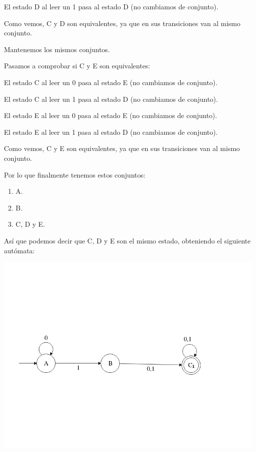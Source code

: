 \documentclass[12pt, spanish]{article}
\begin{document}
El estado D al leer un 1 pasa al estado D (no cambiamos de conjunto).


Como vemos, C y D son equivalentes, ya que en sus transiciones van al mismo conjunto.

Mantenemos los mismos conjuntos.

Pasamos a comprobar si C y E son equivalentes:

El estado C al leer un 0 pasa al estado E (no cambiamos de conjunto).

El estado C al leer un 1 pasa al estado D (no cambiamos de conjunto).

El estado E al leer un 0 pasa al estado E (no cambiamos de conjunto).

El estado E al leer un 1 pasa al estado D (no cambiamos de conjunto).

Como vemos, C y E son equivalentes, ya que en sus transiciones van al mismo conjunto.


Por lo que finalmente tenemos estos conjuntos:


\begin{enumerate}
	\item A.
	\item B.
	\item C, D y E.

\end{enumerate}

Así que podemos decir que C, D y E son el mismo estado, obteniendo el siguiente autómata:

\begin{center}
	\includegraphics[scale=0.45]{minimizado.png}
\end{center}
\end{document}

